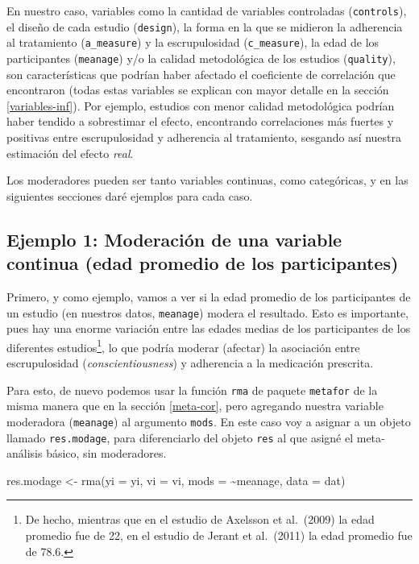 \documentclass[
  bookmarksnumbered]{article}
\newenvironment{Shaded}{\begin{snugshade}}{\end{snugshade}}
\newcommand{\AttributeTok}[1]{\textcolor[rgb]{0.00,0.34,0.68}{#1}}
\newcommand{\FunctionTok}[1]{\textcolor[rgb]{0.39,0.29,0.61}{#1}}
\newcommand{\NormalTok}[1]{\textcolor[rgb]{0.12,0.11,0.11}{#1}}
\newcommand{\OtherTok}[1]{\textcolor[rgb]{0.00,0.43,0.16}{#1}}
\newcommand{\SpecialCharTok}[1]{\textcolor[rgb]{0.24,0.68,0.91}{#1}}
\begin{document}
En nuestro caso, variables como la cantidad de variables controladas (\texttt{controls}), el diseño de cada estudio (\texttt{design}), la forma en la que se midieron la adherencia al tratamiento (\texttt{a\_measure}) y la escrupulosidad (\texttt{c\_measure}), la edad de los participantes (\texttt{meanage}) y/o la calidad metodológica de los estudios (\texttt{quality}), son características que podrían haber afectado el coeficiente de correlación que encontraron (todas estas variables se explican con mayor detalle en la sección \ref{variables-inf}). Por ejemplo, estudios con menor calidad metodológica podrían haber tendido a sobrestimar el efecto, encontrando correlaciones más fuertes y positivas entre escrupulosidad y adherencia al tratamiento, sesgando así nuestra estimación del efecto \emph{real}.

Los moderadores pueden ser tanto variables continuas, como categóricas, y en las siguientes secciones daré ejemplos para cada caso.

\hypertarget{ex-mod1}{%
\subsection{Ejemplo 1: Moderación de una variable continua (edad promedio de los participantes)}\label{ex-mod1}}

Primero, y como ejemplo, vamos a ver si la edad promedio de los participantes de un estudio (en nuestros datos, \texttt{meanage}) modera el resultado. Esto es importante, pues hay una enorme variación entre las edades medias de los participantes de los diferentes estudios\footnote{De hecho, mientras que en el estudio de Axelsson et al.~(2009) la edad promedio fue de 22, en el estudio de Jerant et al.~(2011) la edad promedio fue de 78.6.}, lo que podría moderar (afectar) la asociación entre escrupulosidad (\emph{conscientiousness}) y adherencia a la medicación prescrita.

Para esto, de nuevo podemos usar la función \texttt{rma} de paquete \texttt{metafor} de la misma manera que en la sección \ref{meta-cor}, pero agregando nuestra variable moderadora (\texttt{meanage}) al argumento \texttt{mods}. En este caso voy a asignar a un objeto llamado \texttt{res.modage}, para diferenciarlo del objeto \texttt{res} al que asigné el meta-análisis básico, sin moderadores.

\begin{Shaded}
\begin{Highlighting}[]
\NormalTok{res.modage }\OtherTok{\textless{}{-}} \FunctionTok{rma}\NormalTok{(}\AttributeTok{yi =}\NormalTok{ yi, }\AttributeTok{vi =}\NormalTok{ vi, }
                  \AttributeTok{mods =} \SpecialCharTok{\textasciitilde{}}\NormalTok{meanage, }
                  \AttributeTok{data =}\NormalTok{ dat)}
\end{Highlighting}
\end{Shaded}
\end{document}

